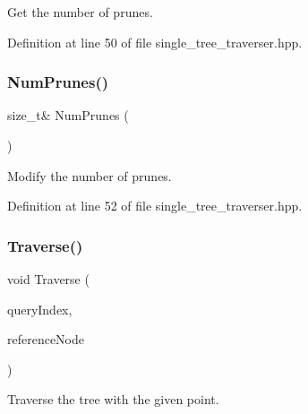 Get the number of prunes. 



Definition at line 50 of file single\+\_\+tree\+\_\+traverser.\+hpp.

\mbox{\label{classmlpack_1_1tree_1_1RectangleTree_1_1SingleTreeTraverser_adf887190e9d9024ff244503e4aaf0732}} 
\subsubsection{Num\+Prunes()\hspace{0.1cm}{\footnotesize\ttfamily [2/2]}}
{\footnotesize\ttfamily size\+\_\+t\& Num\+Prunes (\begin{DoxyParamCaption}{ }\end{DoxyParamCaption})\hspace{0.3cm}{\ttfamily [inline]}}



Modify the number of prunes. 



Definition at line 52 of file single\+\_\+tree\+\_\+traverser.\+hpp.

\mbox{\label{classmlpack_1_1tree_1_1RectangleTree_1_1SingleTreeTraverser_ac0666ded6a40aaa0711e91e890f9f69f}} 
\subsubsection{Traverse()}
{\footnotesize\ttfamily void Traverse (\begin{DoxyParamCaption}\item[{const size\+\_\+t}]{query\+Index,  }\item[{const Rectangle\+Tree \&}]{reference\+Node }\end{DoxyParamCaption})}



Traverse the tree with the given point. 


